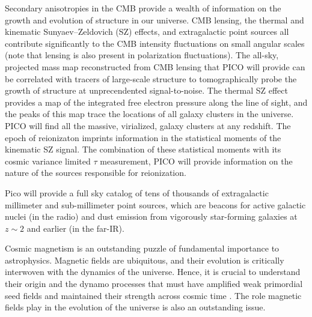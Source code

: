 \documentclass[PICOReport.tex]{subfiles}
\begin{document}
  Secondary anisotropies in the CMB provide
a wealth of information on the growth and evolution of structure in our universe.
CMB lensing, the thermal and kinematic Sunyaev--Zeldovich (SZ)
effects, and extragalactic point sources all contribute significantly
to the CMB intensity fluctuations on small angular scales (note that
lensing is also present in polarization fluctuations). The all-sky,
projected mass map reconstructed from CMB lensing that PICO will
provide can be correlated with tracers of large-scale structure to
tomographically probe the growth of structure at unprecendented
signal-to-noise. The thermal SZ effect provides a map of the
integrated free electron pressure along the line of sight, and the
peaks of this map trace the locations of all galaxy clusters in the
universe. PICO will find all the massive, virialized, galaxy clusters
at any redshift.  The epoch of reionizaton imprints information in the
statistical moments of the kinematic SZ signal.  The combination of
these statistical moments with its cosmic variance limited $\tau$
measurement, PICO will provide information on the nature of the
sources responsible for reionization.

Pico will provide a full sky catalog of tens of thousands of
extragalactic millimeter and sub-millimeter point sources, which are
beacons for active galactic nuclei (in the radio) and dust emission
from vigorously star-forming galaxies at $z \sim 2$ and earlier (in
the far-IR).

Cosmic magnetism is an outstanding puzzle of fundamental importance to astrophysics. Magnetic fields are ubiquitous, and their evolution is critically interwoven with the dynamics of the universe. Hence, it is crucial to understand
their origin and the dynamo processes that must have amplified weak  primordial seed fields 
and maintained their strength across cosmic time \citep{Brandenburg2005}. 
The role magnetic fields play in the evolution of the universe is also an outstanding issue. 
\end{document}
